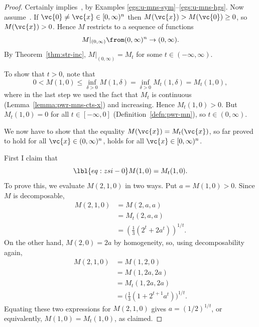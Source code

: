 \begin{proof}
Certainly 
implies~, by Examples
\ref{egs:u-mns-sym}--\ref{egs:u-mns-hgs}.  Now
assume~.  If $\vc{0} \neq \vc{x} \in [0,
\infty)^n$ then $M(\vc{x}) > M(\vc{0}) \geq 0$, so $M(\vc{x}) > 0$.
Hence $M$ restricts to a sequence of functions
\[
M|_{(0, \infty)} \from (0, \infty)^n \to (0, \infty).
\]
By Theorem~\ref{thm:str-inc}, $M|_{(0, \infty)} = M_t$ for some $t \in
(-\infty, \infty)$.  

To show that $t > 0$, note that 
\[
0 
< 
M(1, 0) 
\leq 
\inf_{\delta > 0} M(1, \delta)
= 
\inf_{\delta > 0} M_t(1, \delta) 
= 
M_t(1, 0),
\]
where in the last step we used the fact that $M_t$ is continuous
(Lemma~\ref{lemma:pwr-mns-cts-x}) and increasing.  Hence $M_t(1, 0) > 0$.
But $M_t(1, 0) = 0$ for all $t \in [-\infty, 0]$
(Definition~\ref{defn:pwr-mn}), so $t \in (0, \infty)$.

We now have to show that the equality $M(\vc{x}) = M_t(\vc{x})$, so far
proved to hold for all $\vc{x} \in (0, \infty)^n$, holds for all
$\vc{x} \in [0, \infty)^n$.

First I claim that 
% 
\begin{equation}
\lbl{eq:zsi-0}
M(1, 0) = M_t(1, 0).  
\end{equation}
% 
To prove this, we evaluate $M(2, 1, 0)$ in two ways.  Put $a = M(1, 0) >
0$.  Since $M$ is decomposable,
% 
\begin{align*}
M(2, 1, 0)      &
=
M(2, a, a)      \\
&
=
M_t(2, a, a)    \\
&
=
\left( \tfrac{1}{3} (2^t + 2a^t) \right)^{1/t}.
\end{align*}
% 
On the other hand, $M(2, 0) = 2a$ by homogeneity, so, using decomposability
again,
% 
\begin{align*}
M(2, 1, 0)      &
=
M(1, 2, 0)      \\
&
=
M(1, 2a, 2a)    \\
&
=
M_t(1, 2a, 2a)  \\
&
=
\bigl( \tfrac{1}{3} (1 + 2^{t + 1} a^t) \bigr)^{1/t}.
\end{align*}
% 
Equating these two expressions for $M(2, 1, 0)$ gives $a = (1/2)^{1/t}$, or
equivalently, $M(1, 0) = M_t(1, 0)$, as claimed.


\end{proof}
